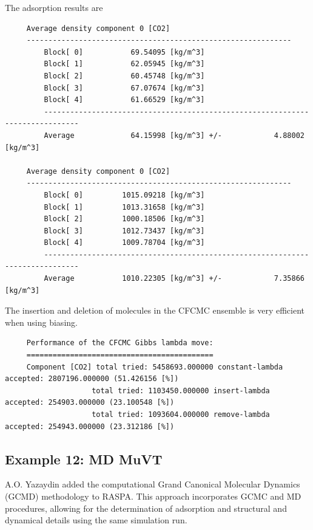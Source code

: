 \noindent
The adsorption results are
\begin{tiny}
\begin{verbatim}
     Average density component 0 [CO2]
     -------------------------------------------------------------
         Block[ 0]           69.54095 [kg/m^3]
         Block[ 1]           62.05945 [kg/m^3]
         Block[ 2]           60.45748 [kg/m^3]
         Block[ 3]           67.07674 [kg/m^3]
         Block[ 4]           61.66529 [kg/m^3]
         ------------------------------------------------------------------------------
         Average             64.15998 [kg/m^3] +/-            4.88002 [kg/m^3]
     
     Average density component 0 [CO2]
     -------------------------------------------------------------
         Block[ 0]         1015.09218 [kg/m^3]
         Block[ 1]         1013.31658 [kg/m^3]
         Block[ 2]         1000.18506 [kg/m^3]
         Block[ 3]         1012.73437 [kg/m^3]
         Block[ 4]         1009.78704 [kg/m^3]
         ------------------------------------------------------------------------------
         Average           1010.22305 [kg/m^3] +/-            7.35866 [kg/m^3]
\end{verbatim}
\end{tiny}

\indent
The insertion and deletion of molecules in the CFCMC ensemble is very efficient when using biasing.
\begin{tiny}
\begin{verbatim}
     Performance of the CFCMC Gibbs lambda move:
     ===========================================
     Component [CO2] total tried: 5458693.000000 constant-lambda accepted: 2807196.000000 (51.426156 [%])
                    total tried: 1103450.000000 insert-lambda accepted: 254903.000000 (23.100548 [%])
                    total tried: 1093604.000000 remove-lambda accepted: 254943.000000 (23.312186 [%])
\end{verbatim}
\end{tiny}

\subsection*{Example 12: MD MuVT}

A.O. Yazaydin added the computational Grand Canonical Molecular Dynamics (GCMD) methodology to RASPA\cite{Loganathan2017,Loganathan2018}.
This approach incorporates GCMC and MD procedures, allowing for the determination of adsorption and structural and 
dynamical details using the same simulation run.

